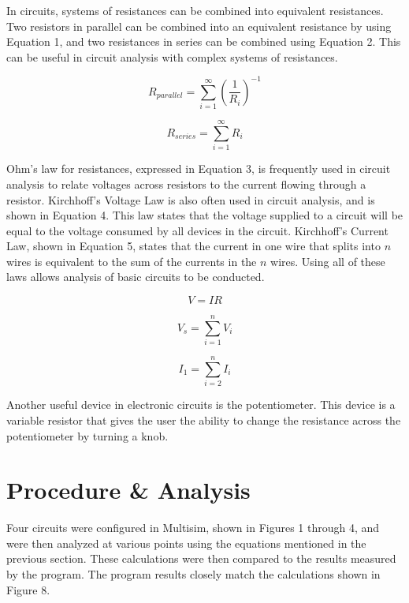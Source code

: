 \documentclass[12pt]{article}
\begin{document}
In circuits, systems of resistances can be combined into equivalent resistances. Two resistors in parallel can be combined into an equivalent resistance by using Equation 1, and two resistances in series can be combined using Equation 2. This can be useful in circuit analysis with complex systems of resistances. 
\bigskip
 
 \begin{equation}
 R_{parallel} =  \sum_{i=1}^{\infty}
 	(\frac{1}{R_{i}})^{-1}
 \end{equation}
 \bigskip
 
 \begin{equation}
 R_{series} =  \sum_{i=1}^{\infty}
	R_{i}
 \end{equation}
 \bigskip
 
 
 
 Ohm's law for resistances, expressed in Equation 3, is frequently used in circuit analysis to relate voltages across resistors to the current flowing through a resistor. Kirchhoff's Voltage Law is also often used in circuit analysis, and is shown in Equation 4. This law states that the voltage supplied to a circuit will be equal to the voltage consumed by all devices in the circuit. Kirchhoff's Current Law, shown in Equation 5, states that the current in one wire that splits into $n$ wires is equivalent to the sum of the currents in the $n$ wires. Using all of these laws allows analysis of basic circuits to be conducted.
 \bigskip
 
 
\begin{equation}
V = IR
\end {equation}
\bigskip

\begin{equation}
V_{s} = \sum_{i=1}^{n}
V_{i}
\end{equation}
\bigskip

\begin{equation}
I_{1} =  \sum_{i=2}^{n}
I_{i}
\end{equation}
\bigskip

Another useful device in electronic circuits is the potentiometer. This device is a variable resistor that gives the user the ability to change the resistance across the potentiometer by turning a knob. 


\section*{\fontsize{12}{12}\selectfont \large Procedure \& Analysis}
Four circuits were configured in Multisim, shown in Figures 1 through 4, and were then analyzed at various points using the equations mentioned in the previous section. These calculations were then compared to the results measured by the program. The program results closely match the calculations shown in Figure 8.
\bigskip
\end{document}
